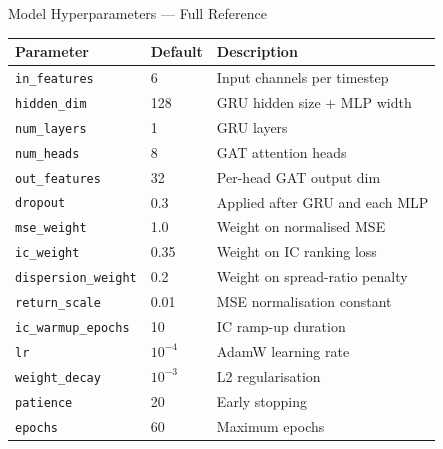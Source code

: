 \documentclass[aspectratio=169, 10pt]{beamer}
\begin{document}
\begin{frame}{Model Hyperparameters — Full Reference}
  \begin{center}
  \renewcommand{\arraystretch}{1.3}
  \begin{tabular}{lll}
    \toprule
    \textbf{Parameter} & \textbf{Default} & \textbf{Description} \\
    \midrule
    \texttt{in\_features}   & 6   & Input channels per timestep \\
    \texttt{hidden\_dim}    & 128 & GRU hidden size + MLP width \\
    \texttt{num\_layers}    & 1   & GRU layers \\
    \texttt{num\_heads}     & 8   & GAT attention heads \\
    \texttt{out\_features}  & 32  & Per-head GAT output dim \\
    \texttt{dropout}        & 0.3 & Applied after GRU and each MLP \\
    \midrule
    \texttt{mse\_weight}        & 1.0  & Weight on normalised MSE \\
    \texttt{ic\_weight}         & 0.35 & Weight on IC ranking loss \\
    \texttt{dispersion\_weight} & 0.2  & Weight on spread-ratio penalty \\
    \texttt{return\_scale}      & 0.01 & MSE normalisation constant \\
    \texttt{ic\_warmup\_epochs} & 10   & IC ramp-up duration \\
    \midrule
    \texttt{lr}           & $10^{-4}$ & AdamW learning rate \\
    \texttt{weight\_decay}& $10^{-3}$ & L2 regularisation \\
    \texttt{patience}     & 20        & Early stopping \\
    \texttt{epochs}       & 60        & Maximum epochs \\
    \bottomrule
  \end{tabular}
  \end{center}
\end{frame}
\end{document}

